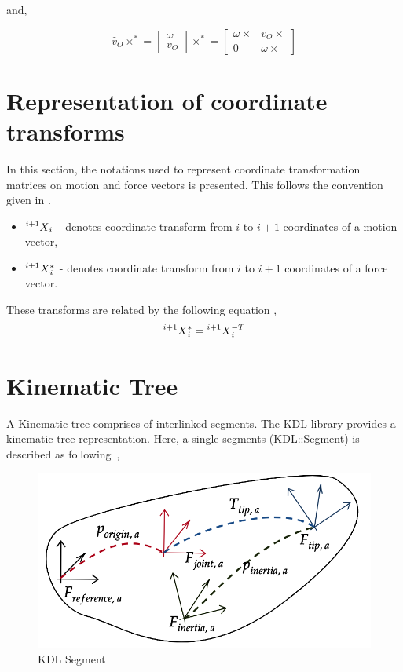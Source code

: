 	and,
	
	\begin{equation}
	\label{eq:cross2}
	\hat v_O \times^* = \begin{bmatrix}
	\omega \\ v_O
	\end{bmatrix} \times^* = \begin{bmatrix}
	\omega \times & v_O \times \\
	0 & \omega \times
	\end{bmatrix}
	\end{equation}
	
\chapter{Representation of coordinate transforms}\label{chap:coordinate}	

In this section, the notations used to represent coordinate transformation matrices on motion and force vectors is presented. This follows the convention given in \cite{featherstone2014rigid}.

\begin{itemize}
	\item $\prescript{i+1}{}{X}_i$ - denotes coordinate transform from $i$ to $i+1$ coordinates of a motion vector,
	\item $\prescript{i+1}{}{X}_i^*$ - denotes coordinate transform from $i$ to $i+1$ coordinates of a force vector.
\end{itemize}

These transforms are related by the following equation \cite{featherstone2014rigid},
$$ \prescript{i+1}{}{X}_i^* = \prescript{i+1}{}{X}_i^{-T}$$

\chapter{Kinematic Tree}

A Kinematic tree comprises of interlinked segments. The \hyperref[kdl]{KDL} library provides a kinematic tree representation. Here, a single segments (KDL::Segment) is described as following~\cite{kinematictreeKDL},

\begin{figure}[h!]
	\label{fig:segment}
	\begin{center}
		\includegraphics[scale=0.3]{images/segment}
	\end{center}
	\caption{KDL Segment}
\end{figure} 

